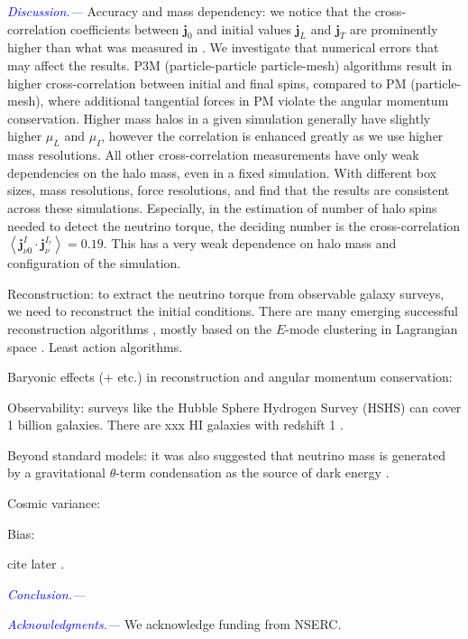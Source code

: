 \documentclass[aps,prd,twocolumn,amsmath,amssymb,amsfont,superscriptaddress]{revtex4-1}
\newcommand{\bs}{\boldsymbol}
\newcommand{\tcb}{\textcolor{blue}}
\begin{document}
\tcb{\textit{Discussion.---}} 
Accuracy and mass dependency: we notice that the cross-correlation coefficients between $\bs{j}_0$ and initial values $\bs{j}_L$ and $\bs{j}_T$ are prominently higher than what was measured in \citep{2000ApJ...532L...5L}. We investigate that numerical errors that may affect the results. P3M (particle-particle particle-mesh) algorithms result in higher cross-correlation between initial and final spins, compared to PM (particle-mesh), where additional tangential forces in PM violate the angular momentum conservation. Higher mass halos in a given simulation generally have slightly higher $\mu_L$ and $\mu_I$, however the correlation is enhanced greatly as we use higher mass resolutions. All other cross-correlation measurements have only weak dependencies on the halo mass, even in a fixed simulation. With different box sizes, mass resolutions, force resolutions, and find that the results are consistent across these simulations. Especially, in the estimation of number of halo spins needed to detect the neutrino torque, the deciding number is the cross-correlation $\left\langle\bs{j}^I_{\nu 0}\cdot\bs{j}^{I_r}_\nu\right\rangle=0.19$. This has a very weak dependence on halo mass and configuration of the simulation.

Reconstruction: to extract the neutrino torque from observable galaxy surveys, we need to reconstruct the initial conditions. There are many emerging successful reconstruction algorithms \citep{2017PhRvD..96l3502Z,2017ApJ...847..110Y,2014ApJ...794...94W}, mostly based on the $E$-mode clustering in Lagrangian space \citep{2017PhRvD..95d3501Y}. Least action algorithms.

Baryonic effects (+ etc.) in reconstruction and angular momentum conservation:

Observability: surveys like the Hubble Sphere Hydrogen Survey (HSHS) \citep{2006astro.ph..6104P} can cover 1 billion galaxies. There are xxx HI galaxies with redshift 1 \citep{2004MNRAS.350.1210Z}.

Beyond standard models: it was also suggested that neutrino mass is generated by a gravitational $\theta$-term condensation as the source of dark energy \citep{2016PhRvD..93k3002D}.

Cosmic variance:

Bias:

cite later \citep{2018MNRAS.tmp.2447C}.

\tcb{\textit{Conclusion.---}} 

\tcb{\textit{Acknowledgments.---}}
We acknowledge funding from NSERC.
\end{document}
